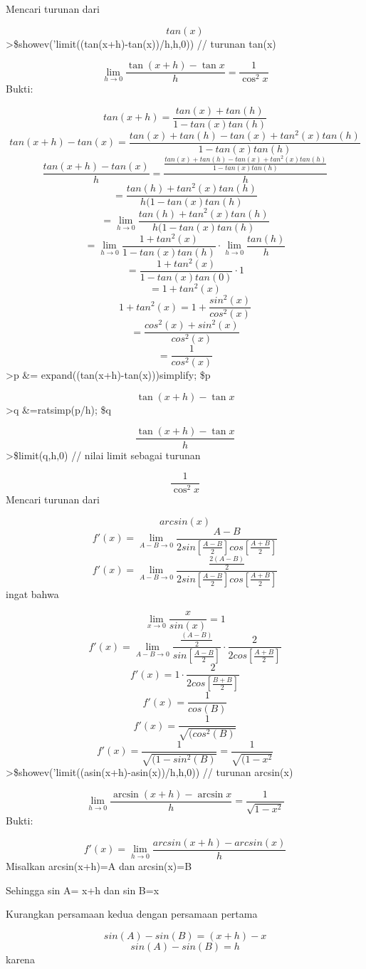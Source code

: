 \documentclass[
]{book}
\begin{document}
Mencari turunan dari

\[tan(x)\]\textgreater\$showev('limit((tan(x+h)-tan(x))/h,h,0)) // turunan tan(x)

\[\lim_{h\rightarrow 0}{\frac{\tan \left(x+h\right)-\tan x}{h}}=  \frac{1}{\cos ^2x}\]Bukti:

\[tan(x+h) = \frac {tan (x)+tan (h)}{1-tan(x)tan(h)}\]\[tan(x+h)-tan (x) ={\frac {tan (x)+tan (h)-tan (x)+tan^2(x)tan(h)}{1-tan(x)tan(h)}}\]\[\frac {tan(x+h)-tan (x)}{h} =\frac{ \frac {tan (x)+tan (h)-tan (x)+tan^2(x)tan(h)}{1-tan(x)tan(h)}}{h}\]\[= \frac {tan(h)+tan^2(x) tan(h)}{h(1-tan(x)tan(h)}\]\[= \lim_{h\to 0} \frac {tan(h)+tan^2(x) tan(h)}{h(1-tan(x)tan(h)}\]\[= \lim_{h\to 0} \frac {1 +tan^2(x)}{1-tan (x)tan(h)} \cdot \lim_{h\to 0} \frac{tan (h)}{h}\]\[= \frac {1 +tan^2(x)}{1-tan (x)tan(0)} \cdot 1\]\[= 1+tan^2(x)\]\[1+tan^2(x)=1+ \frac{sin^2(x)}{cos^2(x)}\]\[= \frac{cos^2(x) + sin^2(x)}{cos^2(x)}\]\[= \frac{1}{cos^2(x)}\]\textgreater p \&= expand((tan(x+h)-tan(x)))\textbar simplify; \$p

\[\tan \left(x+h\right)-\tan x\]\textgreater q \&=ratsimp(p/h); \$q

\[\frac{\tan \left(x+h\right)-\tan x}{h}\]\textgreater\$limit(q,h,0) // nilai limit sebagai turunan

\[\frac{1}{\cos ^2x}\]Mencari turunan dari

\[arcsin(x)\]\[f'(x) = \lim_{A-B \to 0} \frac {A-B}{2 sin [\frac{A-B}{2}] cos [\frac{A+B}{2}]}\]\[f'(x) = \lim_{A-B \to 0} \frac {\frac{2(A-B)}{2}}{2 sin [\frac{A-B}{2}] cos [\frac{A+B}{2}]}\]ingat bahwa

\[\lim_{x \to 0} \frac{x}{sin (x)}=1\]\[f'(x) = \lim_{A-B \to 0}\frac{\frac{(A-B)}{2}}{sin [\frac{A-B}{2}]} \cdot \frac{2}{2cos [\frac{A+B}{2}]}\]\[f'(x) = 1 \cdot \frac{2}{2cos [\frac{B+B}{2}]}\]\[f'(x) = \frac {1}{cos (B)}\]\[f'(x) = \frac {1}{\sqrt{(cos^2 (B)}}\]\[f'(x) = \frac {1}{\sqrt{(1- sin^2 (B)}}= \frac {1}{\sqrt{(1-x^2}}\]\textgreater\$showev('limit((asin(x+h)-asin(x))/h,h,0)) // turunan arcsin(x)

\[\lim_{h\rightarrow 0}{\frac{\arcsin \left(x+h\right)-\arcsin x}{h}}=  \frac{1}{\sqrt{1-x^2}}\]Bukti:

\[f'(x)= \lim_{h\to 0} \frac {arcsin(x+h)-arcsin(x)}{h}\]Misalkan arcsin(x+h)=A dan arcsin(x)=B

Sehingga sin A= x+h dan sin B=x

Kurangkan persamaan kedua dengan persamaan pertama

\[sin(A)-sin(B)=(x+h)-x\]\[sin(A)-sin(B) = h\]karena
\end{document}

